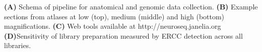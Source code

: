 \textbf{(A)} Schema of pipeline for anatomical and genomic data collection.
\textbf{(B)} Example sections from atlases at low (top), medium (middle) and high (bottom) magnifications.
\textbf{(C)} Web tools available at http://neuroseq.janelia.org
\textbf{(D)}Sensitivity of library preparation measured by ERCC detection across all libraries.
